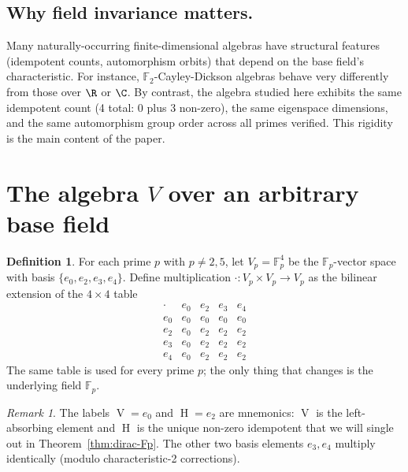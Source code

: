\documentclass[11pt,reqno]{amsart}
\theoremstyle{plain}
\theoremstyle{definition}
\newtheorem{definition}[theorem]{Definition}
\theoremstyle{remark}
\newtheorem*{remark}{Remark}
\newcommand{\F}{\mathbb{F}}
\DeclareMathOperator{\HARM}{H}    %
\DeclareMathOperator{\VOID}{V}    %
\begin{document}
\subsection{Why field invariance matters.}
Many naturally-occurring finite-dimensional algebras have structural
features (idempotent counts, automorphism orbits) that depend on the base
field's characteristic. For instance, $\F_2$-Cayley-Dickson algebras
behave very differently from those over $\R$ or $\C$. By contrast, the
algebra studied here exhibits the same idempotent count (4 total: 0 plus
3 non-zero), the same eigenspace dimensions, and the same automorphism
group order across all primes verified.  This rigidity is the main
content of the paper.

\section{The algebra $V$ over an arbitrary base field}

\begin{definition}\label{def:V-Fp}
For each prime $p$ with $p \neq 2, 5$, let $V_p = \F_p^4$ be the
$\F_p$-vector space with basis $\{e_0, e_2, e_3, e_4\}$.  Define
multiplication $\cdot: V_p \times V_p \to V_p$ as the bilinear extension
of the $4 \times 4$ table
\[
\begin{array}{c|cccc}
\cdot & e_0 & e_2 & e_3 & e_4 \\ \hline
e_0 & e_0 & e_0 & e_0 & e_0 \\
e_2 & e_0 & e_2 & e_2 & e_2 \\
e_3 & e_0 & e_2 & e_2 & e_2 \\
e_4 & e_0 & e_2 & e_2 & e_2
\end{array}
\]
The same table is used for every prime $p$; the only thing that changes
is the underlying field $\F_p$.
\end{definition}

\begin{remark}
The labels $\VOID = e_0$ and $\HARM = e_2$ are mnemonics: $\VOID$ is the
left-absorbing element and $\HARM$ is the unique non-zero idempotent
that we will single out in Theorem~\ref{thm:dirac-Fp}.  The other two
basis elements $e_3, e_4$ multiply identically (modulo
characteristic-2 corrections).
\end{remark}

\end{document}
